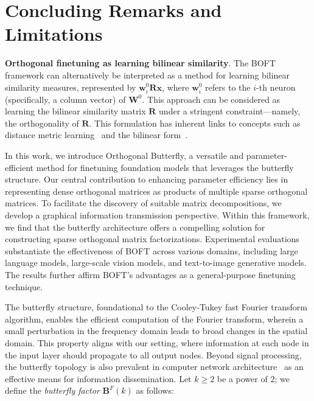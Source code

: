 \section{Concluding Remarks and Limitations}

\textbf{Orthogonal finetuning as learning bilinear similarity}. The BOFT framework can alternatively be interpreted as a method for learning bilinear similarity measures, represented by $\bm{w}^0_i\bm{R}\bm{x}$, where $\bm{w}^0_i$ refers to the $i$-th neuron (specifically, a column vector) of $\bm{W}^0$. This approach can be considered as learning the bilinear similarity matrix $\bm{R}$ under a stringent constraint—namely, the orthogonality of $\bm{R}$. This formulation has inherent links to concepts such as distance metric learning~\cite{xing2002distance} and the bilinear form~\cite{roman2005advanced}.

In this work, we introduce Orthogonal Butterfly, a versatile and parameter-efficient method for finetuning foundation models that leverages the butterfly structure. Our central contribution to enhancing parameter efficiency lies in representing dense orthogonal matrices as products of multiple sparse orthogonal matrices. To facilitate the discovery of suitable matrix decompositions, we develop a graphical information transmission perspective. Within this framework, we find that the butterfly architecture offers a compelling solution for constructing sparse orthogonal matrix factorizations. Experimental evaluations substantiate the effectiveness of BOFT across various domains, including large language models, large-scale vision models, and text-to-image generative models. The results further affirm BOFT's advantages as a general-purpose finetuning technique.



The butterfly structure, foundational to the Cooley-Tukey fast Fourier transform algorithm, enables the efficient computation of the Fourier transform, wherein a small perturbation in the frequency domain leads to broad changes in the spatial domain. This property aligns with our setting, where information at each node in the input layer should propagate to all output nodes. Beyond signal processing, the butterfly topology is also prevalent in computer network architecture~\cite{solihin2015fundamentals,li2011linear} as an effective means for information dissemination. Let $k \geq 2$ be a power of $2$; we define the \emph{butterfly factor} $\bm{B}^F(k)$ as follows:

